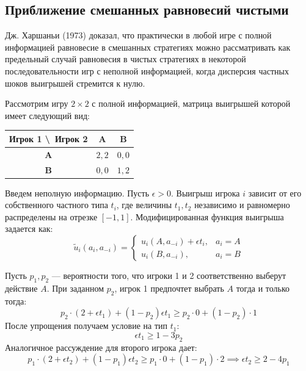 \subsection{Приближение смешанных равновесий чистыми}

\begin{theorem}
Дж. Харшаньи (1973) доказал, что практически в любой игре с полной информацией равновесие в смешанных стратегиях можно рассматривать как предельный случай равновесия в чистых стратегиях в некоторой последовательности игр с неполной информацией, когда дисперсия частных шоков выигрышей стремится к нулю.
\end{theorem}

\begin{example}
Рассмотрим игру $2 \times 2$ с полной информацией, матрица выигрышей которой имеет следующий вид:
\begin{table}[h]
\centering
\renewcommand{\arraystretch}{1.3}
\begin{NiceTabular}{c|cc}
\toprule
\textbf{Игрок 1 \textbackslash\ Игрок 2} & \textbf{A} & \textbf{B} \\
\midrule
\textbf{A} & $2, 2$ & $0, 0$ \\
\textbf{B} & $0, 0$ & $1, 2$ \\
\bottomrule
\end{NiceTabular}
\end{table}

Введем неполную информацию. Пусть $\epsilon > 0$. Выигрыш игрока $i$ зависит от его собственного частного типа $t_i$, где величины $t_1, t_2$ независимо и равномерно распределены на отрезке $[-1, 1]$. Модифицированная функция выигрыша задается как:
\begin{equation}
\tilde{u}_i(a_i, a_{-i}) = 
\begin{cases}
u_i(A, a_{-i}) + \epsilon t_i, & a_i = A \\
u_i(B, a_{-i}), & a_i = B
\end{cases}
\end{equation}

Пусть $p_1, p_2$ — вероятности того, что игроки 1 и 2 соответственно выберут действие $A$. При заданном $p_2$, игрок 1 предпочтет выбрать $A$ тогда и только тогда:
\begin{equation}
p_2 \cdot (2 + \epsilon t_1) + (1 - p_2) \epsilon t_1 \ge p_2 \cdot 0 + (1 - p_2) \cdot 1
\end{equation}
После упрощения получаем условие на тип $t_1$:
\begin{equation}
\epsilon t_1 \ge 1 - 3p_2
\end{equation}
Аналогичное рассуждение для второго игрока дает:
\begin{equation}
p_1 \cdot (2 + \epsilon t_2) + (1 - p_1) \epsilon t_2 \ge p_1 \cdot 0 + (1 - p_1) \cdot 2 \implies \epsilon t_2 \ge 2 - 4p_1
\end{equation}


\end{example}
